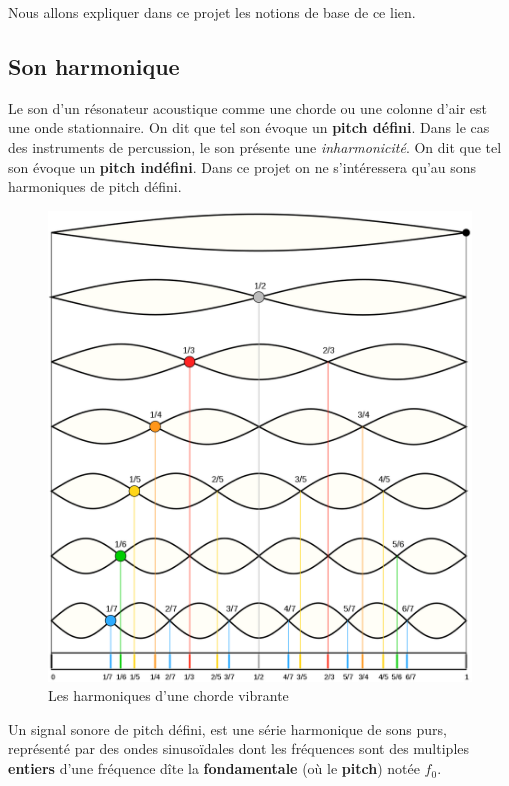 \documentclass[french,]{article}
\begin{document}
Nous allons expliquer dans ce projet les notions de base de ce lien.

\hypertarget{son-harmonique}{%
\subsection{Son harmonique}\label{son-harmonique}}

Le son d'un résonateur acoustique comme une chorde ou une colonne d'air
est une onde stationnaire. On dit que tel son évoque un \textbf{pitch
défini}. Dans le cas des instruments de percussion, le son présente une
\emph{inharmonicité}. On dit que tel son évoque un \textbf{pitch
indéfini}. Dans ce projet on ne s'intéressera qu'au sons harmoniques de
pitch défini.

\begin{figure}
\centering
\includegraphics[width=\textwidth,height=0.35\textheight]{img/harmonic-string.png}
\caption{Les harmoniques d'une chorde vibrante}
\end{figure}

Un signal sonore de pitch défini, est une série harmonique de sons purs,
représenté par des ondes sinusoïdales dont les fréquences sont des
multiples \textbf{entiers} d'une fréquence dîte la \textbf{fondamentale}
(où le \textbf{pitch}) notée \(f_0\).
\end{document}
